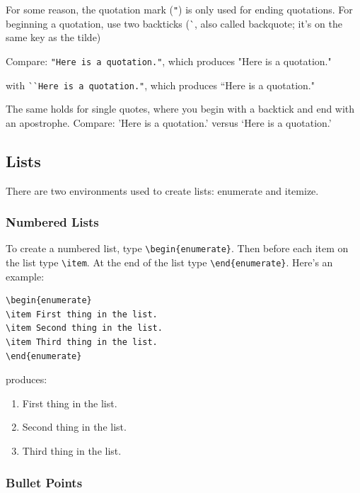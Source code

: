 \documentclass[12pt]{article}
\begin{document}
For some reason, the quotation mark (\verb|"|) is only used for ending quotations. For beginning a quotation, use two backticks (\`{}, also called backquote; it's on the same key as the tilde)

Compare: \verb|"Here is a quotation."|, which produces "Here is a quotation."

with \`{}\`{}\verb|Here is a quotation."|, which produces ``Here is a quotation."

The same holds for single quotes, where you begin with a backtick and end with an apostrophe. Compare: 'Here is a quotation.' versus `Here is a quotation.'

\subsection{Lists}

There are two environments used to create lists: enumerate and itemize.

\subsubsection{Numbered Lists}

To create a numbered list, type \verb|\begin{enumerate}|. Then before each item on the list type \verb|\item|. At the end of the list type \verb|\end{enumerate}|. Here's an example:

\begin{verbatim}
\begin{enumerate}
\item First thing in the list.
\item Second thing in the list.
\item Third thing in the list.
\end{enumerate}
\end{verbatim}
produces:

\begin{enumerate}
\item First thing in the list.
\item Second thing in the list.
\item Third thing in the list.
\end{enumerate}

\subsubsection{Bullet Points}
\end{document}
